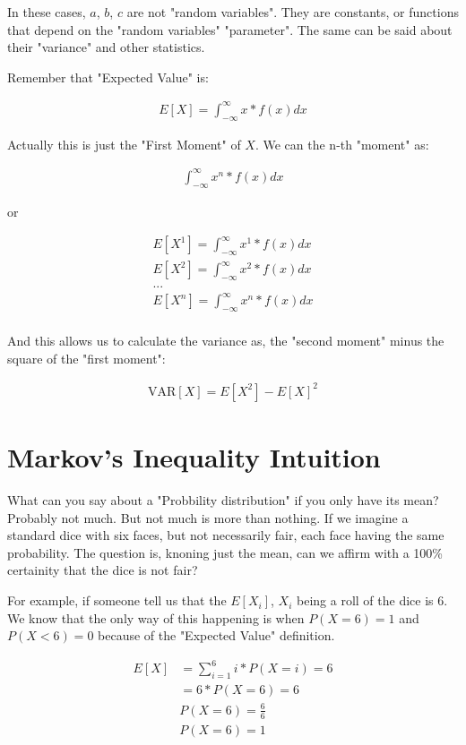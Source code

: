\documentclass[10pt,a4paper]{book}
\begin{document}
In these cases, $a$, $b$, $c$ are not "random variables". They are constants, or functions that depend on the "random variables" "parameter". The same can be said about their "variance" and other statistics.

Remember that "Expected Value" is:

\begin{align}
	E[X] = \int_{-\infty}^{\infty}{x*f(x)dx}
\end{align}

Actually this is just the "First Moment" of $X$. We can the n-th "moment" as:

\begin{align}
	\int_{-\infty}^{\infty}{x^n*f(x)dx}
\end{align}

or

\begin{align*}
	E[X^1] = \int_{-\infty}^{\infty}{x^1*f(x)dx}\\
	E[X^2] = \int_{-\infty}^{\infty}{x^2*f(x)dx}\\
	...\\
	E[X^n] = \int_{-\infty}^{\infty}{x^n*f(x)dx}\\
\end{align*}

And this allows us to calculate the variance as, the "second moment" minus the square of the "first moment":

\begin{align}
	\text{VAR}[X] = E[X^2] - E[X]^2
\end{align}

\section{Markov's Inequality Intuition}
	
What can you say about a "Probbility distribution" if you only have its mean? Probably not much. But not much is more than nothing. If we imagine a standard dice with six faces, but not necessarily fair, each face having the same probability. The question is, knoning just the mean, can we affirm with a 100\% certainity that the dice is not fair?

For example, if someone tell us that the $E[X_i]$, $X_i$ being a roll of the dice is $6$. We know that the only way of this happening is when $P(X = 6) = 1$ and $P(X < 6) = 0$ because of the "Expected Value" definition.

\begin{align*}
	E[X] &= \sum_{i=1}^{6}{i*P(X=i)} = 6\\
	&= 6*P(X=6) = 6\\
	& P(X=6) = \frac{6}{6}\\
	& P(X=6) = 1\\
\end{align*}
\end{document}

